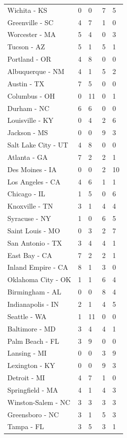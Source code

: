 \documentclass[sn-mathphys-num]{sn-jnl}%
\begin{document}
\begin{center}
\begin{longtable*}{|p{3.75cm}|p{2.5cm}|p{2.5cm}|p{2.5cm}|p{2.5cm}|}
		Wichita - KS & 0 & 0 & 7 & 5 \\
		Greenville - SC & 4 & 7 & 1 & 0 \\
		Worcester - MA & 5 & 4 & 0 & 3 \\
		Tucson - AZ & 5 & 1 & 5 & 1 \\
		Portland - OR & 4 & 8 & 0 & 0 \\
		Albuquerque - NM & 4 & 1 & 5 & 2 \\
		Austin - TX & 7 & 5 & 0 & 0 \\
		Columbus - OH & 0 & 11 & 0 & 1 \\
		Durham - NC & 6 & 6 & 0 & 0 \\
		Louisville - KY & 0 & 4 & 2 & 6 \\
		Jackson - MS & 0 & 0 & 9 & 3 \\
		Salt Lake City - UT & 4 & 8 & 0 & 0 \\
		Atlanta - GA & 7 & 2 & 2 & 1 \\
		Des Moines - IA & 0 & 0 & 2 & 10 \\
		Los Angeles - CA & 4 & 6 & 1 & 1 \\
		Chicago - IL & 1 & 5 & 0 & 6 \\
		Knoxville - TN & 3 & 1 & 4 & 4 \\
		Syracuse - NY & 1 & 0 & 6 & 5 \\
		Saint Louis - MO & 0 & 3 & 2 & 7 \\
		San Antonio - TX & 3 & 4 & 4 & 1 \\
		East Bay - CA & 7 & 2 & 2 & 1 \\
		Inland Empire - CA & 8 & 1 & 3 & 0 \\
		Oklahoma City - OK & 1 & 1 & 6 & 4 \\
		Birmingham - AL & 0 & 0 & 8 & 4 \\
		Indianapolis - IN & 2 & 1 & 4 & 5 \\
		Seattle - WA & 1 & 11 & 0 & 0 \\
		Baltimore - MD & 3 & 4 & 4 & 1 \\
		Palm Beach - FL & 3 & 9 & 0 & 0 \\
		Lansing - MI & 0 & 0 & 3 & 9 \\
		Lexington - KY & 0 & 0 & 9 & 3 \\
		Detroit - MI & 4 & 7 & 1 & 0 \\
		Springfield - MA & 4 & 1 & 4 & 3 \\
		Winston-Salem - NC & 3 & 3 & 3 & 3 \\
		Greensboro - NC & 3 & 1 & 5 & 3 \\
		Tampa - FL & 3 & 5 & 3 & 1 \\

\end{longtable*}
\end{center}
\end{document}
